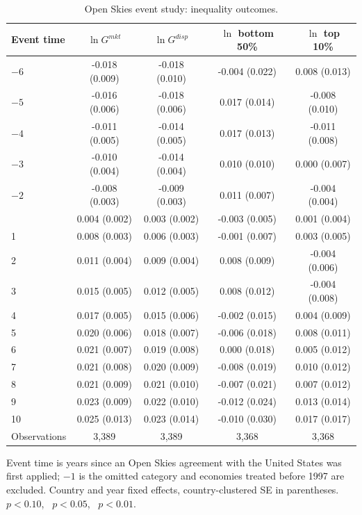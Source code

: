\begin{table}[H]\centering\caption{Open Skies event study: inequality outcomes.}\label{tab:a_es_ineq}
\begin{threeparttable}\small\begin{tabular}{lcccc}
\toprule
Event time & $\ln G^{mkt}$ & $\ln G^{disp}$ & $\ln$ bottom 50\% & $\ln$ top 10\% \\
\midrule
$-6$ & -0.018\sym{*} (0.009) & -0.018\sym{*} (0.010) & -0.004 (0.022) & 0.008 (0.013) \\
$-5$ & -0.016\sym{***} (0.006) & -0.018\sym{***} (0.006) & 0.017 (0.014) & -0.008 (0.010) \\
$-4$ & -0.011\sym{**} (0.005) & -0.014\sym{***} (0.005) & 0.017 (0.013) & -0.011 (0.008) \\
$-3$ & -0.010\sym{**} (0.004) & -0.014\sym{***} (0.004) & 0.010 (0.010) & 0.000 (0.007) \\
$-2$ & -0.008\sym{***} (0.003) & -0.009\sym{***} (0.003) & 0.011 (0.007) & -0.004 (0.004) \\
\addlinespace
0 & 0.004\sym{*} (0.002) & 0.003 (0.002) & -0.003 (0.005) & 0.001 (0.004) \\
1 & 0.008\sym{**} (0.003) & 0.006\sym{*} (0.003) & -0.001 (0.007) & 0.003 (0.005) \\
2 & 0.011\sym{***} (0.004) & 0.009\sym{**} (0.004) & 0.008 (0.009) & -0.004 (0.006) \\
3 & 0.015\sym{***} (0.005) & 0.012\sym{**} (0.005) & 0.008 (0.012) & -0.004 (0.008) \\
4 & 0.017\sym{***} (0.005) & 0.015\sym{**} (0.006) & -0.002 (0.015) & 0.004 (0.009) \\
5 & 0.020\sym{***} (0.006) & 0.018\sym{***} (0.007) & -0.006 (0.018) & 0.008 (0.011) \\
6 & 0.021\sym{***} (0.007) & 0.019\sym{**} (0.008) & 0.000 (0.018) & 0.005 (0.012) \\
7 & 0.021\sym{***} (0.008) & 0.020\sym{**} (0.009) & -0.008 (0.019) & 0.010 (0.012) \\
8 & 0.021\sym{**} (0.009) & 0.021\sym{**} (0.010) & -0.007 (0.021) & 0.007 (0.012) \\
9 & 0.023\sym{**} (0.009) & 0.022\sym{**} (0.010) & -0.012 (0.024) & 0.013 (0.014) \\
10 & 0.025\sym{**} (0.013) & 0.023\sym{*} (0.014) & -0.010 (0.030) & 0.017 (0.017) \\
\midrule
Observations & 3,389 & 3,389 & 3,368 & 3,368 \\
\bottomrule
\end{tabular}
\begin{tablenotes}\footnotesize\item Event time is years since an Open Skies agreement with the United States was first applied; $-1$ is the omitted category and economies treated before 1997 are excluded. Country and year fixed effects, country-clustered SE in parentheses. \sym{*}~$p<0.10$, \sym{**}~$p<0.05$, \sym{***}~$p<0.01$.\end{tablenotes}\end{threeparttable}\end{table}

